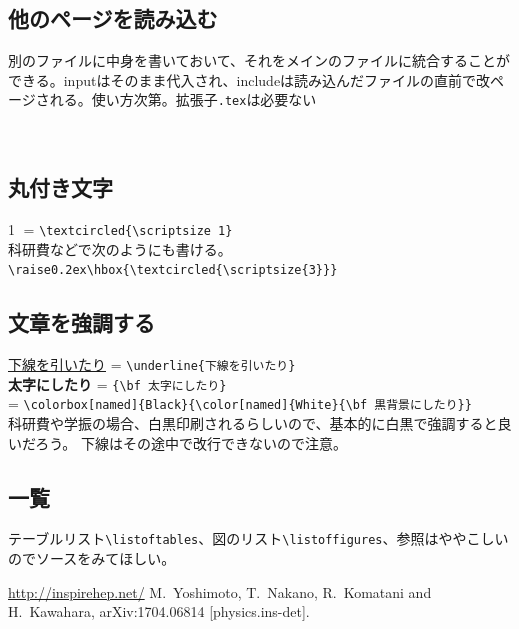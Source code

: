 \documentclass[a4j]{jsarticle}
\begin{document}
\subsection{他のページを読み込む}
別のファイルに中身を書いておいて、それをメインのファイルに統合することができる。inputはそのまま代入され、includeは読み込んだファイルの直前で改ページされる。使い方次第。拡張子\verb|.tex|は必要ない
\begin{verbatim}


\end{verbatim}

\subsection{丸付き文字}
\textcircled{\scriptsize 1} = \verb|\textcircled{\scriptsize 1}|\\
科研費などで次のようにも書ける。\verb|\raise0.2ex\hbox{\textcircled{\scriptsize{3}}}|

\subsection{文章を強調する}
\noindent
\underline{下線を引いたり} = \verb|\underline{下線を引いたり}|\\
{\bf 太字にしたり} = \verb|{\bf 太字にしたり}|\\
\colorbox[named]{Black}{\color[named]{White}{\bf 黒背景にしたり}} = \verb|\colorbox[named]{Black}{\color[named]{White}{\bf 黒背景にしたり}}|\\
科研費や学振の場合、白黒印刷されるらしいので、基本的に白黒で強調すると良いだろう。 下線はその途中で改行できないので注意。

\subsection{一覧}
テーブルリスト\verb|\listoftables|、図のリスト\verb|\listoffigures|、参照はややこしいのでソースをみてほしい。
\listoftables %
\listoffigures %

\begin{thebibliography}{99}
\url{http://inspirehep.net/}
  M.~Yoshimoto, T.~Nakano, R.~Komatani and H.~Kawahara,
  arXiv:1704.06814 [physics.ins-det].
\end{thebibliography}
\end{document}
